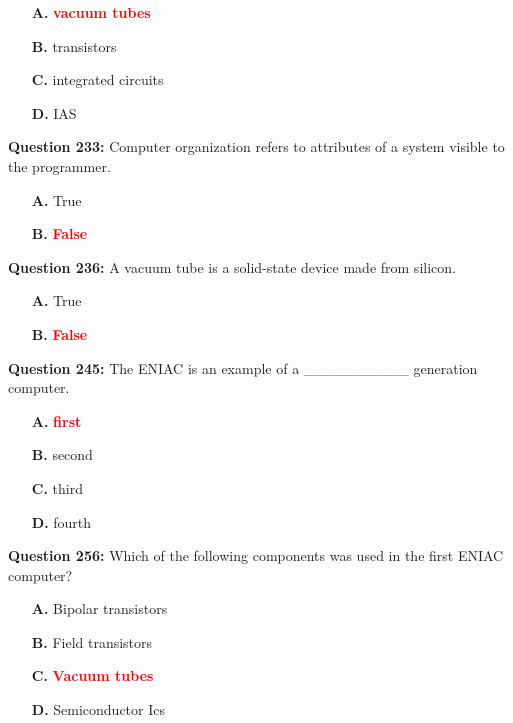 \documentclass[12pt,a4paper]{article}
\begin{document}
\begin{itemize}
    \item[\textbf{A.}] \textcolor{red}{\textbf{vacuum tubes}}
    \item[\textbf{B.}] transistors
    \item[\textbf{C.}] integrated circuits
    \item[\textbf{D.}] IAS
\end{itemize}

\vspace{0.5cm}

\textbf{Question 233:} Computer organization refers to attributes of a system visible to the programmer.

\begin{itemize}
    \item[\textbf{A.}] True
    \item[\textbf{B.}] \textcolor{red}{\textbf{False}}
\end{itemize}

\vspace{0.5cm}

\textbf{Question 236:} A vacuum tube is a solid-state device made from silicon.

\begin{itemize}
    \item[\textbf{A.}] True
    \item[\textbf{B.}] \textcolor{red}{\textbf{False}}
\end{itemize}

\vspace{0.5cm}

\textbf{Question 245:} The ENIAC is an example of a __________ generation computer.

\begin{itemize}
    \item[\textbf{A.}] \textcolor{red}{\textbf{first}}
    \item[\textbf{B.}] second
    \item[\textbf{C.}] third
    \item[\textbf{D.}] fourth
\end{itemize}

\vspace{0.5cm}

\textbf{Question 256:} Which of the following components was used in the first ENIAC computer?

\begin{itemize}
    \item[\textbf{A.}] Bipolar transistors
    \item[\textbf{B.}] Field transistors
    \item[\textbf{C.}] \textcolor{red}{\textbf{Vacuum tubes}}
    \item[\textbf{D.}] Semiconductor Ics
\end{itemize}
\end{document}
